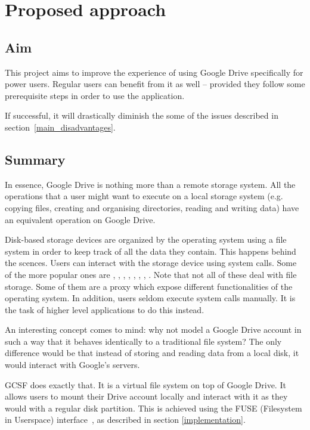 \chapter{Proposed approach}

\section{Aim}

This project aims to improve the experience of using Google Drive specifically for power users. Regular users can benefit from it as well -- provided they follow some prerequisite steps in order to use the application.

If successful, it will drastically diminish the some of the issues described in section~\ref{main_disadvantages}.

\section{Summary}

In essence, Google Drive is nothing more than a remote storage system. All the operations that a user might want to execute on a local storage system (e.g. copying files, creating and organising directories, reading and writing data) have an equivalent operation on Google Drive.

Disk-based storage devices are organized by the operating system using a file system in order to keep track of all the data they contain. This happens behind the scences. Users can interact with the storage device using system calls. Some of the more popular ones are , , , , , , , . Note that not all of these deal with file storage. Some of them are a proxy which expose different functionalities of the operating system. In addition, users seldom execute system calls manually. It is the task of higher level applications to do this instead.

An interesting concept comes to mind: why not model a Google Drive account in such a way that it behaves identically to a traditional file system? The only difference would be that instead of storing and reading data from a local disk, it would interact with Google's servers.

GCSF does exactly that. It is a virtual file system on top of Google Drive. It allows users to mount their Drive account locally and interact with it as they would with a regular disk partition. This is achieved using the FUSE (Filesystem in Userspace) interface~\cite{libfuse}, as described in section \ref{implementation}.

